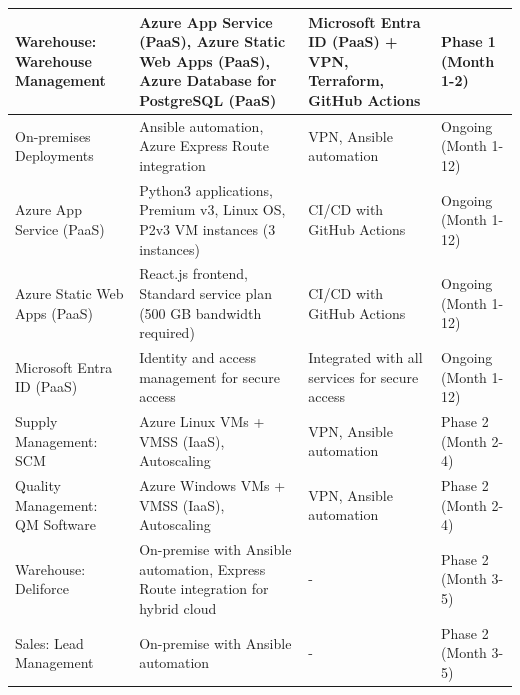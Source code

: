 \documentclass{llncs}
\begin{document}
\begin{longtable}{|p{3.1cm}|p{5.2cm}|p{3.1cm}|l|}
    \hline
    Warehouse: Warehouse Management                   & Azure App Service (PaaS), Azure Static Web Apps (PaaS), Azure Database for PostgreSQL (PaaS)                 & Microsoft Entra ID (PaaS) + VPN, Terraform, GitHub Actions & Phase 1 (Month 1-2)  \\
    \hline
    On-premises Deployments                           & Ansible automation, Azure Express Route integration                                                          & VPN, Ansible automation                                    & Ongoing (Month 1-12) \\
    \hline
    Azure App Service (PaaS)                          & Python3 applications, Premium v3, Linux OS, P2v3 VM instances (3 instances)                                  & CI/CD with GitHub Actions                                  & Ongoing (Month 1-12) \\
    \hline
    Azure Static Web Apps (PaaS)                      & React.js frontend, Standard service plan (500 GB bandwidth required)                                         & CI/CD with GitHub Actions                                  & Ongoing (Month 1-12) \\
    \hline
    Microsoft Entra ID (PaaS)                         & Identity and access management for secure access                                                             & Integrated with all services for secure access             & Ongoing (Month 1-12) \\
    \hline
    Supply Management: SCM                            & Azure Linux VMs + VMSS (IaaS), Autoscaling                                                                   & VPN, Ansible automation                                    & Phase 2 (Month 2-4)  \\
    \hline
    Quality Management: QM Software                   & Azure Windows VMs + VMSS (IaaS), Autoscaling                                                                 & VPN, Ansible automation                                    & Phase 2 (Month 2-4)  \\
    \hline
    Warehouse: Deliforce                              & On-premise with Ansible automation, Express Route integration for hybrid cloud                               & -                                                          & Phase 2 (Month 3-5)  \\
    \hline
    Sales: Lead Management                            & On-premise with Ansible automation                                                                           & -                                                          & Phase 2 (Month 3-5)  \\

\end{longtable}
\end{document}
